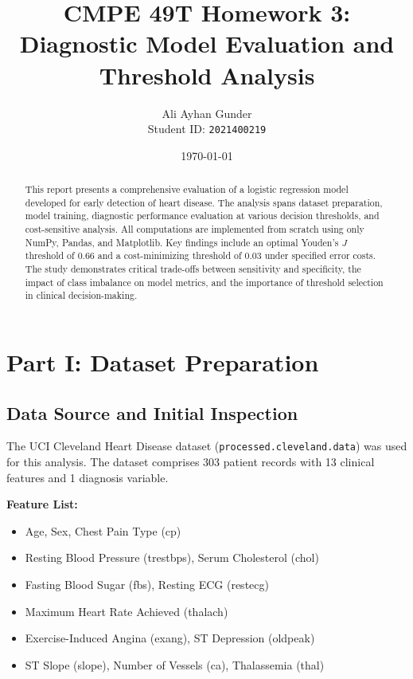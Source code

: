 \documentclass[11pt]{article}
\title{\textbf{CMPE 49T Homework 3:} \\
        Diagnostic Model Evaluation and Threshold Analysis}
\author{Ali Ayhan Gunder \\
Student ID: \texttt{2021400219}}
\date{\today}
\begin{document}
\maketitle

\begin{abstract}
This report presents a comprehensive evaluation of a logistic regression model developed for early detection of heart disease. 
The analysis spans dataset preparation, model training, diagnostic performance evaluation at various decision thresholds, 
and cost-sensitive analysis. All computations are implemented from scratch using only NumPy, Pandas, and Matplotlib. 
Key findings include an optimal Youden's $J$ threshold of 0.66 and a cost-minimizing threshold of 0.03 under specified error costs. 
The study demonstrates critical trade-offs between sensitivity and specificity, the impact of class imbalance on model metrics, 
and the importance of threshold selection in clinical decision-making.
\end{abstract}

\tableofcontents
\newpage

\section{Part I: Dataset Preparation}

\subsection{Data Source and Initial Inspection}

The UCI Cleveland Heart Disease dataset (\texttt{processed.cleveland.data}) was used for this analysis. 
The dataset comprises 303 patient records with 13 clinical features and 1 diagnosis variable.

\textbf{Feature List:}
\begin{itemize}
    \item Age, Sex, Chest Pain Type (cp)
    \item Resting Blood Pressure (trestbps), Serum Cholesterol (chol)
    \item Fasting Blood Sugar (fbs), Resting ECG (restecg)
    \item Maximum Heart Rate Achieved (thalach)
    \item Exercise-Induced Angina (exang), ST Depression (oldpeak)
    \item ST Slope (slope), Number of Vessels (ca), Thalassemia (thal)
\end{itemize}
\end{document}
